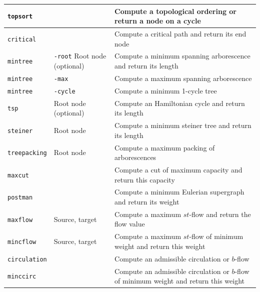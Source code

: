 \documentclass[a4paper,11pt,twoside]{book}
\begin{document}
\begin{center}
\begin{tabular}{|p{3cm}|p{8cm}|p{12.5cm}|}
\hline
\verb/topsort/          &
                        & Compute a topological ordering or return a node on a cycle \\
\hline
\verb/critical/         &
                        & Compute a critical path and return its end node \\
\hline
\verb/mintree/          & \verb/-root/ Root node (optional)
                        & Compute a minimum spanning arborescence and return its length \\
\hline
\verb/mintree/          & \verb/-max/
                        & Compute a maximum spanning arborescence \\
\hline
\verb/mintree/          & \verb/-cycle/
                        & Compute a minimum 1-cycle tree \\
\hline
\verb/tsp/              & Root node (optional)
                        & Compute an Hamiltonian cycle and return its length \\
\hline
\verb/steiner/          & Root node
                        & Compute a minimum steiner tree and return its length \\
\hline
\verb/treepacking/      & Root node
                        & Compute a maximum packing of arborescences \\
\hline
\verb/maxcut/           &
                        & Compute a cut of maximum capacity and return this capacity \\
\hline
\verb/postman/          &
                        & Compute a minimum Eulerian supergraph and return its weight \\
\hline
\verb/maxflow/          & Source, target
                        & Compute a maximum $st$-flow and return the flow value \\
\hline
\verb/mincflow/         & Source, target 
                        & Compute a maximum $st$-flow of minimum weight and return this weight \\
\hline
\verb/circulation/      & & Compute an admissible circulation or $b$-flow \\
\hline
\verb/minccirc/         & & Compute an admissible circulation or $b$-flow
                            of minimum weight and return this weight \\
\hline
\end{tabular}
\end{center}


\end{document}
